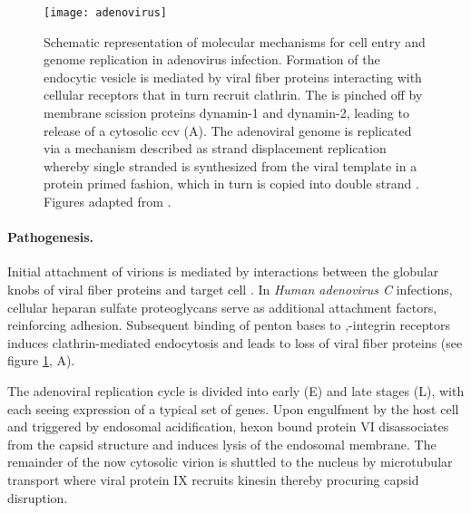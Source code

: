 \begin{figure}
  \centering
  \texttt{[image: adenovirus]}
  \caption[Molecular mechanisms of adenovirus infection.]{Schematic representation of molecular mechanisms for cell entry and genome replication in adenovirus infection. Formation of the endocytic vesicle is mediated by viral fiber proteins interacting with cellular receptors that in turn recruit clathrin. The  is pinched off by membrane scission proteins dynamin-1 and dynamin-2, leading to release of a cytosolic \acrshort{ccv} (A). The adenoviral genome is replicated via a mechanism described as  strand displacement replication whereby single stranded  is synthesized from the viral template in a protein primed fashion, which in turn is copied into double strand . Figures adapted from \citet{Hulo2011}.}
  \label{fig:adenovirus}
\end{figure}

\paragraph{Pathogenesis.}
Initial attachment of virions is mediated by interactions between the globular knobs of viral fiber proteins and target cell . In \textit{Human adenovirus C} infections, cellular heparan sulfate proteoglycans serve as additional attachment factors, reinforcing adhesion. Subsequent binding of penton bases to \textalpha,\textbeta-integrin receptors induces clathrin-mediated endocytosis and leads to loss of viral fiber proteins (see figure \ref{fig:adenovirus}, A).

The adenoviral replication cycle is divided into early (E) and late stages (L), with each seeing expression of a typical set of genes. Upon engulfment by the host cell and triggered by endosomal acidification, hexon bound protein VI disassociates from the capsid structure and induces lysis of the endosomal membrane. The remainder of the now cytosolic virion is shuttled to the nucleus by microtubular transport where viral protein IX recruits kinesin thereby procuring capsid disruption.


